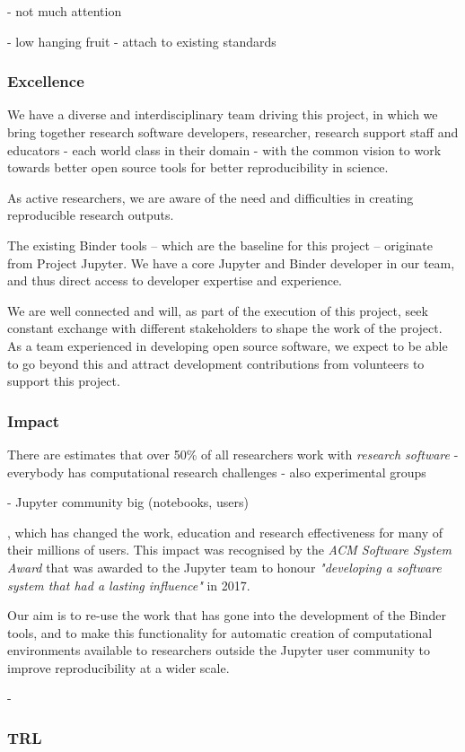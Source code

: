 - not much attention

- low hanging fruit - attach to existing standards



\subsubsection{Excellence}

We have a diverse and interdisciplinary team driving this project, in which we
bring together research software developers, researcher, research support staff
and educators - each world class in their domain - with the common vision to
work towards better open source tools for better reproducibility in science.

As active researchers, we are aware of the need and difficulties in creating
reproducible research outputs. 

The existing Binder tools -- which are the baseline for this project --
originate from Project Jupyter. We have a core Jupyter and Binder developer in
our team, and thus direct access to developer expertise and experience.

We are well connected and will, as part of the execution of this project, seek
constant exchange with different stakeholders to shape the work of the
\TheProject project. As a team experienced in developing open source software,
we expect to be able to go beyond this and attract development contributions
from volunteers to support this project.

\subsubsection{Impact}

There are estimates that over 50\% of all researchers work with \emph{research software}
- everybody has computational research challenges
  - also experimental groups

  - Jupyter community big (notebooks, users)

  , which has changed the work, education and
  research effectiveness for many of their millions of users. This impact was
  recognised by the \emph{ACM Software System Award} that was awarded to the
  Jupyter team to honour \emph{"developing a software system that had a lasting
    influence"} in 2017.
  
  Our aim is to re-use the work that has gone into the development of the Binder
  tools, and to make this functionality for automatic creation of computational
  environments available to researchers outside the Jupyter user community to
  improve reproducibility at a wider scale.

- 


\subsubsection{TRL}